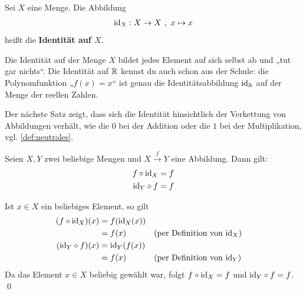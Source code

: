 \begin{defin}[Identitätsabbildung] 
    Sei $X$ eine Menge. Die Abbildung
    \begin{align*}
        \mathrm{id}_X: X \to X \ ,\ x \mapsto x
    \end{align*}
    heißt die \textbf{Identität auf $X$}.
\end{defin}


\begin{bem}
    Die Identität auf der Menge $X$ bildet jedes Element auf sich selbst ab und „tut gar nichts“. Die Identität auf $\mathbb R$ kennst du auch schon aus der Schule: die Polynomfunktion „$f(x)=x$“ ist genau die Identitätsabbildung $\mathrm{id}_\mathbb R$ auf der Menge der reellen Zahlen.
\end{bem}


\noindent Der nächste Satz zeigt, dass sich die Identität hinsichtlich der Verkettung von Abbildungen verhält, wie die $0$ bei der Addition oder die $1$ bei der Multiplikation, vgl. \cref{def:neutrales}.


\begin{satz} \label{idneutral}
    Seien $X,Y$ zwei beliebige Mengen und $X\xrightarrow{f} Y$ eine Abbildung. Dann gilt:
    \begin{align*}
        f\circ \mathrm{id}_X & = f \\
        \mathrm{id}_Y \circ f & = f
    \end{align*}
\end{satz}


\begin{bew}
    Ist $x \in X$ ein beliebiges Element, so gilt
    \begin{align*}
        (f\circ \mathrm{id}_X)(x) & = f(\mathrm{id}_X(x)) \\
        & =f(x) && (\text{per Definition von $\mathrm{id}_X$}) \\
        (\mathrm{id}_Y \circ f)(x) & =\mathrm{id}_Y(f(x)) \\
        & = f(x)&& (\text{per Definition von $\mathrm{id}_Y$})
    \end{align*}
    Da das Element $x\in X$ beliebig gewählt war, folgt $f\circ \mathrm{id}_X=f$ und $\mathrm{id}_Y\circ f=f$. \qed
\end{bew}


